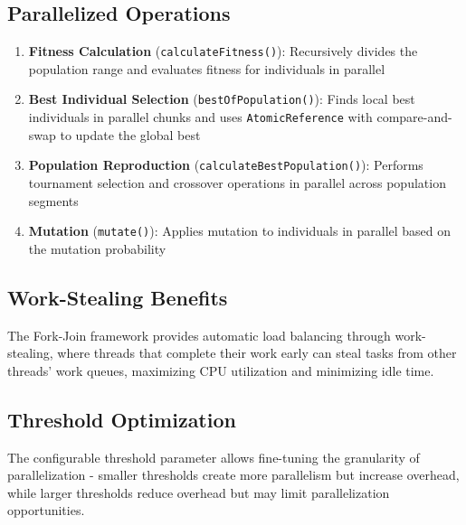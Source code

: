 \subsection{Parallelized Operations}

\begin{enumerate}
    \item \textbf{Fitness Calculation} (\texttt{calculateFitness()}): Recursively divides the population range and evaluates fitness for individuals in parallel
    \item \textbf{Best Individual Selection} (\texttt{bestOfPopulation()}): Finds local best individuals in parallel chunks and uses \texttt{AtomicReference} with compare-and-swap to update the global best
    \item \textbf{Population Reproduction} (\texttt{calculateBestPopulation()}): Performs tournament selection and crossover operations in parallel across population segments
    \item \textbf{Mutation} (\texttt{mutate()}): Applies mutation to individuals in parallel based on the mutation probability
\end{enumerate}

\subsection{Work-Stealing Benefits}
The Fork-Join framework provides automatic load balancing through work-stealing, where threads that complete their work early can steal tasks from other threads' work queues, maximizing CPU utilization and minimizing idle time.

\subsection{Threshold Optimization}
The configurable threshold parameter allows fine-tuning the granularity of parallelization - smaller thresholds create more parallelism but increase overhead, while larger thresholds reduce overhead but may limit parallelization opportunities.